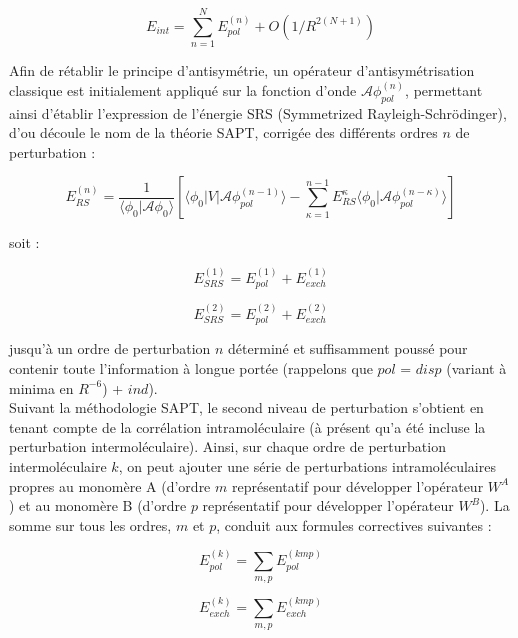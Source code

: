 	\begin{equation}
	E_{int} = \sum_{n=1}^{N} E_{pol}^{(n)} + O(1/R^{2 (N+1)})
	\end{equation}
	
	Afin de rétablir le principe d’antisymétrie, un opérateur d’antisymétrisation classique est initialement appliqué sur la fonction d’onde $\mathscr{A} \phi_{pol}^{(n)}$, permettant ainsi d’établir l’expression de l’énergie SRS (Symmetrized Rayleigh-Schr\"{o}dinger), d’ou découle le nom de la théorie SAPT, corrigée des différents ordres $n$ de perturbation :
	
	\begin{equation}
	E_{RS}^{(n)} = \frac{1}{\langle\phi_{0}|\mathscr{A}\phi_{0}\rangle} \left[\langle\phi_{0} | V| \mathscr{A} \phi_{pol}^{(n-1)}\rangle - \sum_{\kappa=1}^{n-1} E_{RS}^{\kappa} \langle \phi_{0}|\mathscr{A} \phi_{pol}^{(n-\kappa)}\rangle\right]
	\end{equation}
	
	soit :
	
	\begin{equation}
	E_{SRS}^{(1)} = E_{pol}^{(1)} + E_{exch}^{(1)}
	\end{equation}
	
	\begin{equation}
	E_{SRS}^{(2)} = E_{pol}^{(2)} + E_{exch}^{(2)}
	\end{equation}
	
	jusqu’à un ordre de perturbation $n$ déterminé et suffisamment poussé pour contenir toute l’information à longue portée (rappelons que $pol$ = $disp$ (variant à minima en $R^{-6}$) + $ind$).\\
	
	
	Suivant la méthodologie SAPT, le second niveau de perturbation s’obtient en tenant compte de la corrélation intramoléculaire (à présent qu'a été incluse la perturbation intermoléculaire). Ainsi, sur chaque ordre de perturbation intermoléculaire $k$, on peut ajouter une série de perturbations intramoléculaires propres au monomère A (d’ordre $m$ représentatif pour développer l’opérateur $W^{A}$) et au monomère B (d’ordre $p$ représentatif pour développer l’opérateur $W^{B}$). La somme sur tous les ordres, $m$ et $p$, conduit aux formules correctives suivantes :
	
	\begin{equation}
	E_{pol}^{(k)} = \sum_{m,p} E_{pol}^{(kmp)}
	\end{equation}
	
	\begin{equation}
	E_{exch}^{(k)} = \sum_{m,p} E_{exch}^{(kmp)}
	\end{equation}
	
